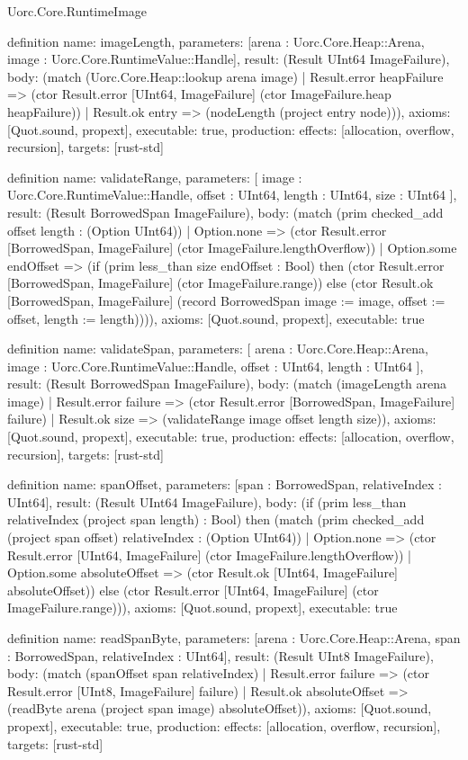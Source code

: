 \begin{lexlean}{Uorc.Core.RuntimeImage}
\begin{semanticmodule}
definition{
  name: imageLength,
  parameters: [arena : Uorc.Core.Heap::Arena, image : Uorc.Core.RuntimeValue::Handle],
  result: (Result UInt64 ImageFailure),
  body: (match (Uorc.Core.Heap::lookup arena image)
    | Result.error heapFailure => (ctor Result.error [UInt64, ImageFailure] (ctor ImageFailure.heap heapFailure))
    | Result.ok entry => (nodeLength (project entry node))),
  axioms: [Quot.sound, propext],
  executable: true,
  production: {effects: [allocation, overflow, recursion], targets: [rust-std]}
}

definition{
  name: validateRange,
  parameters: [
    image : Uorc.Core.RuntimeValue::Handle,
    offset : UInt64,
    length : UInt64,
    size : UInt64
  ],
  result: (Result BorrowedSpan ImageFailure),
  body: (match (prim checked_add offset length : (Option UInt64))
    | Option.none => (ctor Result.error [BorrowedSpan, ImageFailure] (ctor ImageFailure.lengthOverflow))
    | Option.some endOffset => (if (prim less_than size endOffset : Bool) then (ctor Result.error [BorrowedSpan, ImageFailure] (ctor ImageFailure.range)) else (ctor Result.ok [BorrowedSpan, ImageFailure] (record BorrowedSpan {image := image, offset := offset, length := length})))),
  axioms: [Quot.sound, propext],
  executable: true
}

definition{
  name: validateSpan,
  parameters: [
    arena : Uorc.Core.Heap::Arena,
    image : Uorc.Core.RuntimeValue::Handle,
    offset : UInt64,
    length : UInt64
  ],
  result: (Result BorrowedSpan ImageFailure),
  body: (match (imageLength arena image)
    | Result.error failure => (ctor Result.error [BorrowedSpan, ImageFailure] failure)
    | Result.ok size => (validateRange image offset length size)),
  axioms: [Quot.sound, propext],
  executable: true,
  production: {effects: [allocation, overflow, recursion], targets: [rust-std]}
}

definition{
  name: spanOffset,
  parameters: [span : BorrowedSpan, relativeIndex : UInt64],
  result: (Result UInt64 ImageFailure),
  body: (if (prim less_than relativeIndex (project span length) : Bool) then (match (prim checked_add (project span offset) relativeIndex : (Option UInt64))
    | Option.none => (ctor Result.error [UInt64, ImageFailure] (ctor ImageFailure.lengthOverflow))
    | Option.some absoluteOffset => (ctor Result.ok [UInt64, ImageFailure] absoluteOffset)) else (ctor Result.error [UInt64, ImageFailure] (ctor ImageFailure.range))),
  axioms: [Quot.sound, propext],
  executable: true
}

definition{
  name: readSpanByte,
  parameters: [arena : Uorc.Core.Heap::Arena, span : BorrowedSpan, relativeIndex : UInt64],
  result: (Result UInt8 ImageFailure),
  body: (match (spanOffset span relativeIndex)
    | Result.error failure => (ctor Result.error [UInt8, ImageFailure] failure)
    | Result.ok absoluteOffset => (readByte arena (project span image) absoluteOffset)),
  axioms: [Quot.sound, propext],
  executable: true,
  production: {effects: [allocation, overflow, recursion], targets: [rust-std]}
}


\end{semanticmodule}
\end{lexlean}
